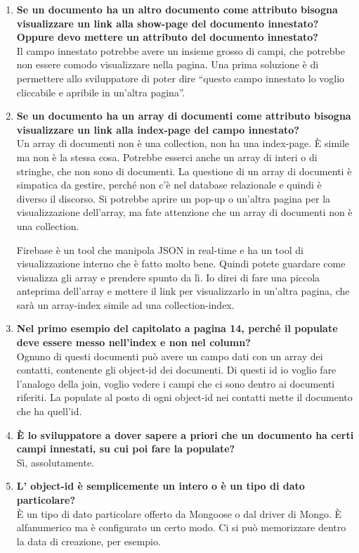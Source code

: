 \begin{enumerate}
		\item
		{\bfseries Se un documento ha un altro documento come attributo bisogna visualizzare un link alla show-page del documento innestato? Oppure devo mettere un attributo del documento innestato?} \\
		Il campo innestato potrebbe avere un insieme grosso di campi, che potrebbe non essere comodo visualizzare nella pagina. Una prima soluzione è di permettere allo sviluppatore di poter dire ``questo campo innestato lo voglio cliccabile e apribile in un'altra pagina''.
		
		\item
		{\bfseries Se un documento ha un array di documenti come attributo bisogna visualizzare un link alla index-page del campo innestato?} \\
		Un array di documenti non è una collection, non ha una index-page. È simile ma non è la stessa cosa. Potrebbe esserci anche un array di interi o di stringhe, che non sono di documenti. La questione di un array di documenti è simpatica da gestire, perché non c'è nel database relazionale e quindi è diverso il discorso. Si potrebbe aprire un pop-up o un'altra pagina per la visualizzazione dell'array, ma fate attenzione che un array di documenti non è una collection.
		
		Firebase è un tool che manipola JSON in real-time e ha un tool di visualizzazione interno che è fatto molto bene. Quindi potete guardare come visualizza gli array e prendere spunto da lì. Io direi di fare una piccola anteprima dell'array e mettere il link per visualizzarlo in un'altra pagina, che sarà un array-index simile ad una collection-index.
		
		\item
		{\bfseries Nel primo esempio del capitolato a pagina 14, perché il populate deve essere messo nell'index e non nel column?} \\
		Ognuno di questi documenti può avere un campo dati con un array dei contatti, contenente gli object-id dei documenti. Di questi id io voglio fare l'analogo della join, voglio vedere i campi che ci sono dentro ai documenti riferiti. La populate al posto di ogni object-id nei contatti mette il documento che ha quell'id.
		
		\item
		{\bfseries È lo sviluppatore a dover sapere a priori che un documento ha certi campi innestati, su cui poi fare la populate?} \\
		Sì, assolutamente.
		
		\item
		{\bfseries L' object-id è semplicemente un intero o è un tipo di dato particolare?} \\
		È un tipo di dato particolare offerto da Mongoose o dal driver di Mongo. È alfanumerico ma è configurato un certo modo. Ci si può memorizzare dentro la data di creazione, per esempio.
		

\end{enumerate}
